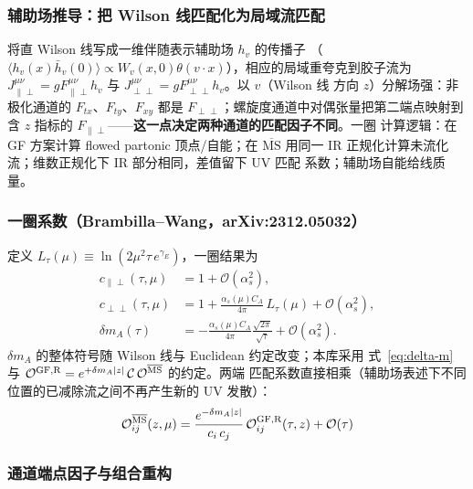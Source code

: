 \documentclass[11pt,a4paper]{ctexart}
\newcommand{\MSbarM}{\overline{\text{MS}}}
\newcommand{\abs}[1]{\lvert #1\rvert}
\newcommand{\order}[1]{\mathcal{O}(#1)}
\begin{document}
\subsubsection{辅助场推导：把 Wilson 线匹配化为局域流匹配}

将直 Wilson 线写成一维伴随表示辅助场 $h_v$ 的传播子
（$\langle h_v(x)\bar h_v(0)\rangle \propto W_v(x,0)
\theta(v\!\cdot\!x)$），相应的局域重夸克到胶子流为
$J_{\parallel\perp}^{\mu\nu}=gF_{\parallel\perp}^{\mu\nu}h_v$ 与
$J_{\perp\perp}^{\mu\nu}=gF_{\perp\perp}^{\mu\nu}h_v$。以 $v$（Wilson 线
方向 $z$）分解场强：非极化通道的 $F_{tx}$、$F_{ty}$、$F_{xy}$ 都是
$F_{\perp\perp}$；螺旋度通道中对偶张量把第二端点映射到含 $z$ 指标的
$F_{\parallel\perp}$——\textbf{这一点决定两种通道的匹配因子不同}。一圈
计算逻辑：在 GF 方案计算 flowed partonic 顶点/自能；在 $\MSbarM$ 用同一
IR 正规化计算未流化流；维数正规化下 IR 部分相同，差值留下 UV 匹配
系数；辅助场自能给线质量。

\subsubsection{一圈系数（Brambilla--Wang，arXiv:2312.05032）}

定义 $L_\tau(\mu)\equiv\ln(2\mu^2\tau\,e^{\gamma_E})$，一圈结果为
\begin{align}
c_{\parallel\perp}(\tau,\mu) &= 1 + \order{\alpha_s^2}, \label{eq:c-parallel}\\
c_{\perp\perp}(\tau,\mu) &= 1 + \frac{\alpha_s(\mu)C_A}{4\pi}
\,L_\tau(\mu) + \order{\alpha_s^2}, \label{eq:c-perp}\\
\delta m_A(\tau) &= -\frac{\alpha_s(\mu)C_A}{4\pi}
\frac{\sqrt{2\pi}}{\sqrt{\tau}} + \order{\alpha_s^2}. \label{eq:delta-m}
\end{align}
$\delta m_A$ 的整体符号随 Wilson 线与 Euclidean 约定改变；本库采用
式~\eqref{eq:delta-m} 与 $\mathcal O^{\rm GF,R}
=e^{+\delta m_A\abs{z}}\,\mathcal C\,\mathcal O^{\MSbarM}$ 的约定。两端
匹配系数直接相乘（辅助场表述下不同位置的已减除流之间不再产生新的 UV
发散）：
\begin{equation}\label{eq:flow-quasi-factor}
\mathcal O_{ij}^{\MSbarM}(z,\mu)
= \frac{e^{-\delta m_A\abs{z}}}{c_i\,c_j}\,
\mathcal O_{ij}^{\rm GF,R}(\tau,z) + \order{\tau}
\end{equation}

\subsubsection{通道端点因子与组合重构}
\end{document}
